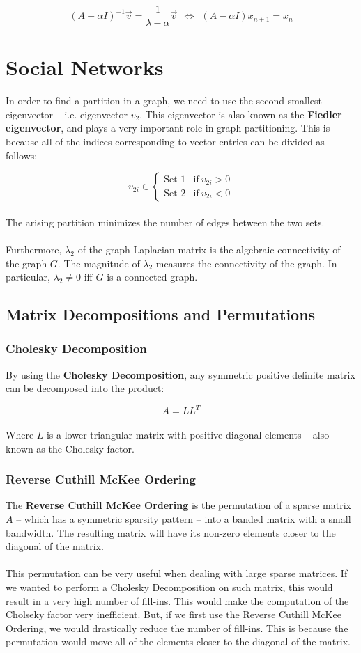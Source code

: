 \documentclass{article}
\begin{document}
\[ (A-\alpha I)^{-1} \overrightarrow{v} = \frac{1}{\lambda - \alpha}\overrightarrow{v}~~ \iff ~~(A-\alpha I) x_{n+1} = x_n \]

\section{Social Networks}
In order to find a partition in a graph, we need to use the second smallest eigenvector -- i.e. eigenvector $v_2$. This eigenvector is also known as the \textbf{Fiedler eigenvector}, and plays a very important role in graph partitioning. This is because all of the indices corresponding to vector entries can be divided as follows:

\[ v_{2i} \in \begin{cases} \text{Set 1} & \text{if}~ v_{2i} > 0 \\ \text{Set 2} & \text{if}~ v_{2i} < 0 \end{cases} \] \\
The arising partition minimizes the number of edges between the two sets. \\ \\ 
Furthermore, $\lambda_2$ of the graph Laplacian matrix is the algebraic connectivity of the graph $G$. The magnitude of $\lambda_2$ measures the connectivity of the graph. In particular, $\lambda_2 \neq 0$ iff $G$ is a connected graph.

\subsection{Matrix Decompositions and Permutations}
\subsubsection{Cholesky Decomposition}
By using the \textbf{Cholesky Decomposition}, any symmetric positive definite matrix can be decomposed into the product:

\[ A = L L^T \] \\
Where $L$ is a lower triangular matrix with positive diagonal elements -- also known as the Cholesky factor.

\subsubsection{Reverse Cuthill McKee Ordering}
The \textbf{Reverse Cuthill McKee Ordering} is the permutation of a sparse matrix $A$ -- which has a symmetric sparsity pattern -- into a banded matrix with a small bandwidth. The resulting matrix will have its non-zero elements closer to the diagonal of the matrix. \\ \\
This permutation can be very useful when dealing with large sparse matrices. If we wanted to perform a Cholesky Decomposition on such matrix, this would result in a very high number of fill-ins. This would make the computation of the Cholseky factor very inefficient. But, if we first use the Reverse Cuthill McKee Ordering, we would drastically reduce the number of fill-ins. This is because the permutation would move all of the elements closer to the diagonal of the matrix.
\end{document}
